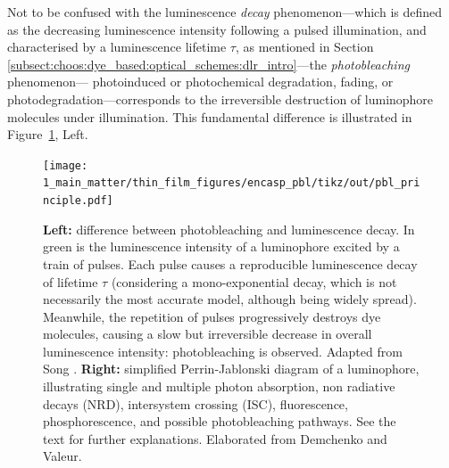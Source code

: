 Not to be confused with the luminescence \emph{decay} phenomenon---which is defined as the decreasing luminescence intensity following a pulsed illumination, and characterised by a luminescence lifetime $\tau$, as mentioned in Section \ref{subsect:choos:dye_based:optical_schemes:dlr_intro}---the \emph{photobleaching} phenomenon---\aka{} photoinduced or photochemical degradation, fading, or photodegradation---corresponds to the irreversible destruction of luminophore molecules under illumination. This fundamental difference is illustrated in Figure~\ref{fig:thin_film:pbl:pbl_principle}, Left.

\begin{figure}
	\centering
	\texttt{[image: 1\_main\_matter/thin\_film\_figures/encasp\_pbl/tikz/out/pbl\_principle.pdf]}
	\caption[Difference between luminescence decay and photobleaching, and possible photobleaching pathways.]{\textbf{Left:} difference between photobleaching and luminescence decay. In green is the luminescence intensity of a luminophore excited by a train of pulses. Each pulse causes a reproducible luminescence decay of lifetime $\tau$ (considering a mono-exponential decay, which is not necessarily the most accurate model, although being widely spread\cite{wlodarczyk2003}). Meanwhile, the repetition of pulses progressively destroys dye molecules, causing a slow but irreversible decrease in overall luminescence intensity: photobleaching is observed. Adapted from Song \etal{}\cite{song1995}. \textbf{Right:} simplified Perrin-Jablonski diagram of a luminophore, illustrating single and multiple photon absorption, non radiative decays (NRD), intersystem crossing (ISC), fluorescence, phosphorescence, and possible photobleaching pathways. See the text for further explanations. Elaborated from Demchenko\cite{demchenko2020} and Valeur\cite[Chap.~3]{valeur2012molecfluo}.}
	\label{fig:thin_film:pbl:pbl_principle}
\end{figure}

